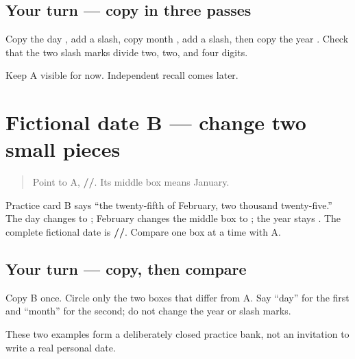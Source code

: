 \subsection*{Your turn — copy in three passes}
Copy the day \textbf{}, add a slash, copy month \textbf{}, add a slash, then copy the year \textbf{}. Check that the two slash marks divide two, two, and four digits.

\begin{tcolorbox}[breakable,colback=teal!4,colframe=teal!35!black,title={Before you move on}]
Keep A visible for now. Independent recall comes later.
\end{tcolorbox}
\section[\texorpdfstring{\pa{੨੫}/\pa{੦੨}/\pa{੨੦੨੫} (fictional February date B)}{੨੫/੦੨/੨੦੨੫ (fictional February date B)}]{Fictional date B — change two small pieces}

\label{lesson:PA-W09-date-b}



\begin{quote}
Point to A, \textbf{//}. Its middle box means January.
\end{quote}

\begin{tcolorbox}[breakable,skin=enhanced,colback=orange!6,colframe=orange!45!black,boxrule=0.5pt,arc=1mm,left=6pt,right=6pt,top=4pt,bottom=4pt,fonttitle=\bfseries,title={Read this}]
Practice card B says “the twenty-fifth of February, two thousand twenty-five.” The day changes to \textbf{}; February changes the middle box to \textbf{}; the year stays \textbf{}. The complete fictional date is \textbf{//}. Compare one box at a time with A.
\end{tcolorbox}

\subsection*{Your turn — copy, then compare}
Copy B once. Circle only the two boxes that differ from A. Say “day” for the first and “month” for the second; do not change the year or slash marks.

\begin{tcolorbox}[breakable,colback=teal!4,colframe=teal!35!black,title={Before you move on}]
These two examples form a deliberately closed practice bank, not an invitation to write a real personal date.
\end{tcolorbox}
